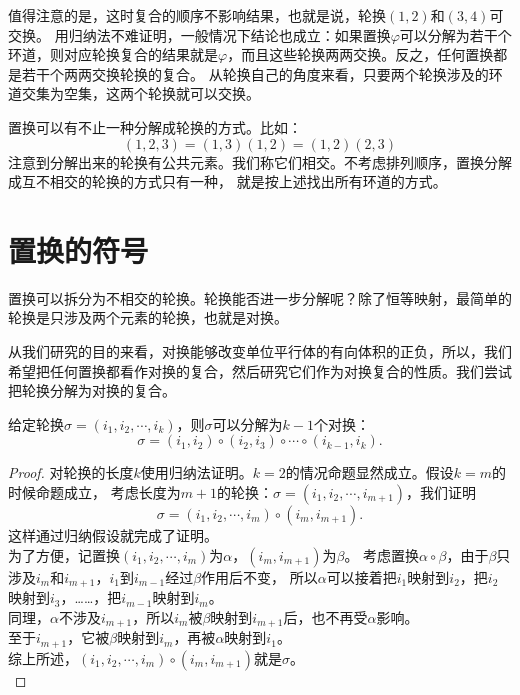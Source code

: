 \documentclass[12pt,UTF8]{ctexbook}
\begin{document}
值得注意的是，这时复合的顺序不影响结果，也就是说，轮换$(1, 2)$和$(3, 4)$可交换。
用归纳法不难证明，一般情况下结论也成立：如果置换$\varphi$可以分解为若干个环道，则对应轮换复合的结果就是$\varphi$，而且这些轮换两两交换。反之，任何置换都是若干个两两交换轮换的复合。
从轮换自己的角度来看，只要两个轮换涉及的环道交集为空集，这两个轮换就可以交换。

置换可以有不止一种分解成轮换的方式。比如：
$$(1,2,3) = (1,3)(1,2) = (1,2)(2,3)$$
注意到分解出来的轮换有公共元素。我们称它们相交。不考虑排列顺序，置换分解成互不相交的轮换的方式只有一种，
就是按上述找出所有环道的方式。

\section{置换的符号}
置换可以拆分为不相交的轮换。轮换能否进一步分解呢？除了恒等映射，最简单的轮换是只涉及两个元素的轮换，也就是对换。

从我们研究的目的来看，对换能够改变单位平行体的有向体积的正负，所以，我们希望把任何置换都看作对换的复合，然后研究它们作为对换复合的性质。我们尝试把轮换分解为对换的复合。
\begin{pp}\label{pp:10_5}
    给定轮换$\sigma = (i_1, i_2, \cdots, i_k)$，则$\sigma$可以分解为$k-1$个对换：
    $$ \sigma = (i_1, i_2) \circ (i_2, i_3) \circ \cdots \circ (i_{k-1}, i_k). $$
\end{pp}
\begin{proof} %
    对轮换的长度$k$使用归纳法证明。$k=2$的情况命题显然成立。假设$k=m$的时候命题成立，
    考虑长度为$m+1$的轮换：$\sigma = (i_1, i_2, \cdots, i_{m+1})$，我们证明
    $$ \sigma = (i_1, i_2, \cdots, i_m) \circ (i_m, i_{m+1}).$$
    这样通过归纳假设就完成了证明。\\
    为了方便，记置换$(i_1, i_2, \cdots, i_m)$为$\alpha$，$(i_m, i_{m+1})$为$\beta$。
    考虑置换$\alpha \circ \beta$，由于$\beta$只涉及$i_m$和$i_{m+1}$，$i_1$到$i_{m-1}$经过$\beta$作用后不变，
    所以$\alpha$可以接着把$i_1$映射到$i_2$，把$i_2$映射到$i_3$，……，把$i_{m-1}$映射到$i_{m}$。\\
    同理，$\alpha$不涉及$i_{m+1}$，所以$i_m$被$\beta$映射到$i_{m+1}$后，也不再受$\alpha$影响。\\
    至于$i_{m+1}$，它被$\beta$映射到$i_m$，再被$\alpha$映射到$i_1$。\\
    综上所述，$(i_1, i_2, \cdots, i_m) \circ (i_m, i_{m+1})$就是$\sigma$。\\
\end{proof}
\end{document}
